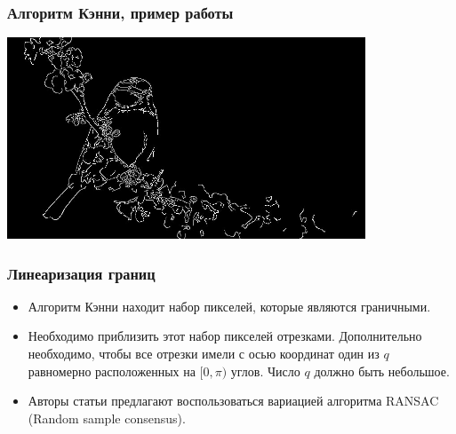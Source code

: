 \begin{frame}\frametitle{Алгоритм Кэнни, пример работы}
    \begin{center}
        \includegraphics[height=6cm]{veselov_imgs/edge_map3.jpg}
    \end{center}
\end{frame}

\begin{frame}\frametitle{Линеаризация границ}
    \begin{itemize}
        \item Алгоритм Кэнни находит набор пикселей, которые являются граничными.
        \pause
        \item Необходимо приблизить этот набор пикселей отрезками. Дополнительно необходимо, чтобы
        все отрезки имели с осью координат один из $q$ равномерно расположенных на $[0, \pi)$ углов.
        Число $q$ должно быть небольшое.
        \pause
        \item Авторы статьи предлагают воспользоваться вариацией алгоритма RANSAC (Random sample consensus).
    \end{itemize}
\end{frame}

